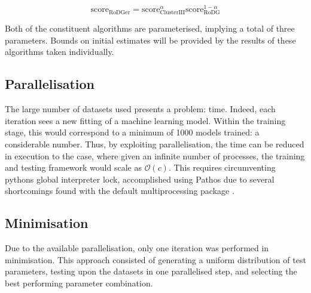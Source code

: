 \begin{equation}
    \label{eq:holyTrinity}
    {\mathrm{score}_\mathrm{RoDGer}=\mathrm{score}_\mathrm{Cluster III}^{\alpha}\mathrm{score}_\mathrm{RoDG}^{1-\alpha}}
\end{equation}

Both of the constituent algorithms are parameterised, implying a total of three parameters. Bounds on initial estimates will be provided by the results of these algorithms taken individually.

\subsection{Parallelisation}
The large number of datasets used presents a problem: time. Indeed, each iteration sees a new fitting of a machine learning model. Within the training stage, this would correspond to a minimum of 1000 models trained: a considerable number. Thus, by exploiting parallelisation, the time can be reduced in execution to the case, where given an infinite number of processes, the training and testing framework would scale as $\mathcal{O}(c)$. This requires circumventing pythons global interpreter lock, accomplished using Pathos due to several shortcomings found with the default multiprocessing package \cite{pathos1,pathos2}.

\subsection{Minimisation}
Due to the available parallelisation, only one iteration was performed in minimisation. This approach consisted of generating a uniform distribution of test parameters, testing upon the datasets in one parallelised step, and selecting the best performing parameter combination.

